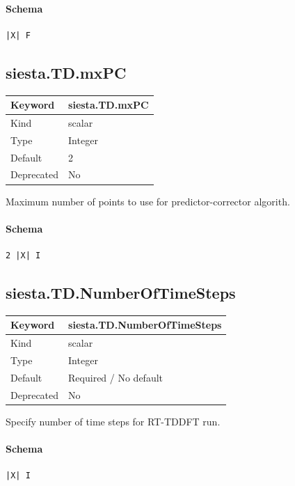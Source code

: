 \documentclass[11pt]{article}
\begin{document}
{{{{{\paragraph{Schema}
\begin{Verbatim}
|X| F
\end{Verbatim}

\subsection{siesta.TD.mxPC}
\label{kw:siesta-TD-mxPC}
\begin{longtable}{|p{1.5in}|p{4.5in}|}
\hline
Keyword & siesta.TD.mxPC \\
\hline
Kind & scalar \\
\hline
Type & Integer \\
\hline
Default & 2 \\
\hline
Deprecated & No \\
\hline
\end{longtable}
 Maximum number of points to use for predictor-corrector algorith.

\paragraph{Schema}
\begin{Verbatim}
2 |X| I
\end{Verbatim}

\subsection{siesta.TD.NumberOfTimeSteps}
\label{kw:siesta-TD-NumberOfTimeSteps}
\begin{longtable}{|p{1.5in}|p{4.5in}|}
\hline
Keyword & siesta.TD.NumberOfTimeSteps \\
\hline
Kind & scalar \\
\hline
Type & Integer \\
\hline
Default & Required / No default \\
\hline
Deprecated & No \\
\hline
\end{longtable}
 Specify number of time steps for RT-TDDFT run.

\paragraph{Schema}
\begin{Verbatim}
|X| I
\end{Verbatim}

}}}}}
\end{document}
